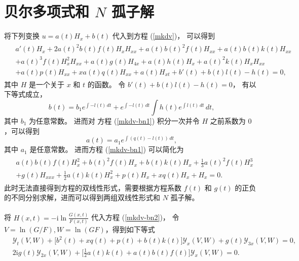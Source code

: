 \section{贝尔多项式和 $N$ 孤子解}
将下列变换 $u=a(t) H_{x}+b(t)$ 代入到方程 (\ref{mkdv})， 可以得到
\begin{align}
\begin{split}
& a'(t) H_{x}+2 a(t)^2 b(t) f(t) H_{x} H_{xx}+a(t) b(t)^2 f(t) H_{xx}+a(t) b(t) k(t) H_{xx}\\ %
& +a(t)^3 f(t) H_{x}^2 H_{xx}+a(t) g(t) H_{4x}+a(t) h(t) H_{x}+a(t)^2 k(t) H_{x} H_{xx}\\
& +a(t) p(t) H_{xx}+x a(t) q(t) H_{xx}+a(t) H_{xt}+b'(t)+b(t) l(t)-h(t)=0,
\end{split}
\label{mkdv-bn1}
\end{align}
其中 $H$ 是一个关于 $x$ 和 $t$ 的函数。 令 $b'(t)+b(t) l(t)-h(t)=0$， 有以下等式成立，
\begin{equation}
b(t)=b_1 e^{\int -l(t) \, dt}+e^{\int -l(t) \, dt} \int h(t) e^{\int l(t) \, dt} \, dt,
\end{equation}
其中 $b_1$ 为任意常数。
进而对 方程 (\ref{mkdv-bn1}) 积分一次并令 $H$ 之前系数为 $0$ ，可以得到
\begin{equation}
a(t)= a_1 e^{\int(q(t)-l(t)) \, dt},
\end{equation}
其中 $a_1$ 是任意常数。
进而方程 (\ref{mkdv-bn1}) 可以简化为
\begin{align}
\begin{split}
& a(t) b(t) f(t) H_{x}^2+ b(t)^2 f(t) H_{x}+ b(t) k(t) H_{x}+\frac{1}{3} a(t)^2 f(t) H_{x}^3\\
& + g(t) H_{xxx}+\frac{1}{2} a(t) k(t) H_{x}^2+ p(t) H_{x}+x  q(t) H_{x}+ H_{x}=0 .
\end{split}
\label{mkdv-bn2}
\end{align}
此时无法直接得到方程的双线性形式，需要根据方程系数 $f(t)$ 和 $g(t)$ 的正负的不同分别求解，进而可以得到两组双线性形式和 $N$ 孤子解。\\
\vspace{1mm}
\vspace{1mm}\\
将 $H(x,t)= -\mbox{i} \ln{\frac{G(x,t)}{F(x,t)}}$
代入方程 (\ref{mkdv-bn2})， 令 $V=\ln(G/F), W=\ln(GF)$，得到如下等式
\begin{align}
&
\mathcal{Y}_{t}(V,W)+\big[b^2(t)+x q(t) +p(t)+b(t)k(t)\big]\mathcal{Y}_{x}(V,W)+g(t) \mathcal{Y}_{3x}(V,W)=0,\\
&
2\mbox{i}g(t)\mathcal{Y}_{2x}(V,W)+ \big[\frac{1}{2}a(t)k(t)+a(t)b(t)f(t)\big] \mathcal{Y}_{x}(V,W)  =0.
\end{align}
